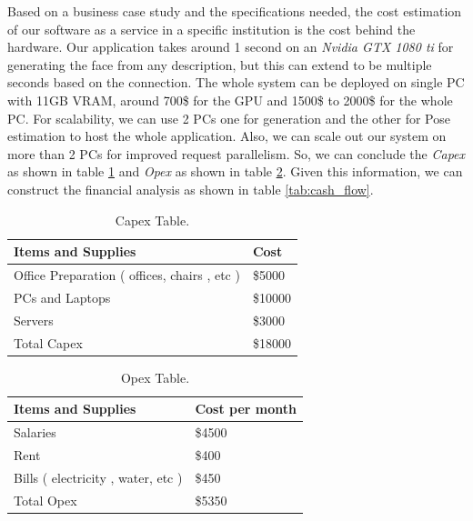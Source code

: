 \newpage

Based on a business case study and the specifications needed, the cost estimation of our software as a service in a specific institution is the cost behind the hardware. Our application takes around 1 second on an \emph{Nvidia GTX 1080 ti} for generating the face from any description, but this can extend to be multiple seconds based on the connection. The whole system can be deployed on single PC with 11GB VRAM, around 700\$ for the GPU and 1500\$ to 2000\$ for the whole PC. For scalability, we can use 2 PCs one for generation and the other for Pose estimation to host the whole application. Also, we can scale out our system on more than 2 PCs for improved request parallelism. So, we can conclude the \emph{Capex} as shown in table \ref{tab:capex} and \emph{Opex} as shown in table \ref{tab:opex}. Given this information, we can construct the financial analysis as shown in table \ref{tab:cash_flow}.

\begin{table}[H]
\centering
\caption{Capex Table.}
\begin{tabular}[t]{| l | l |}
\hline
Items and Supplies & Cost \\
\hline
 Office Preparation ( offices, chairs , etc )&  \$5000  \\
\hline
 PCs and Laptops & \$10000 \\
\hline
Servers & \$3000 \\
\hline
Total Capex & \$18000 \\
\hline
\end{tabular}
\label{tab:capex}
\end{table}

\begin{table}[H]
\centering
\caption{Opex Table.}
\begin{tabular}[t]{| l | l |}
\hline
Items and Supplies & Cost per month \\
\hline
Salaries & \$4500 \\
\hline
Rent & \$400 \\
\hline
Bills ( electricity , water, etc ) & \$450\\
\hline
Total Opex & \$5350 \\
\hline
\end{tabular}
\label{tab:opex}
\end{table}


